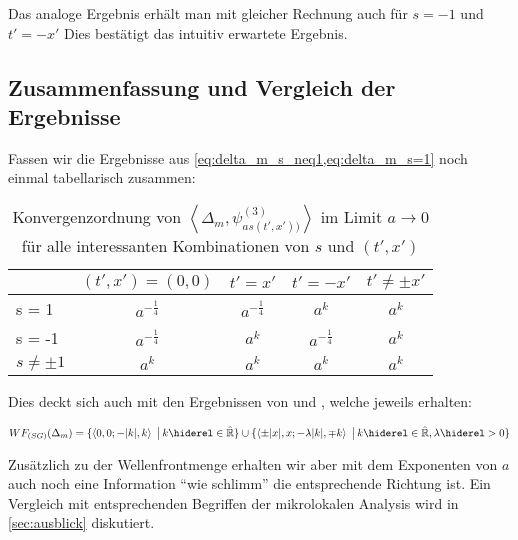 Das analoge Ergebnis erhält man mit gleicher Rechnung auch für $s=-1$ und $t' = -x'$
Dies bestätigt das intuitiv erwartete Ergebnis.

\subsection{Zusammenfassung und Vergleich der Ergebnisse}
 Fassen wir die Ergebnisse aus
 \cref{eq:delta_m_s_neq1,eq:delta_m_s=1} noch einmal tabellarisch zusammen:

\begin{table}[h]
\centering
\begin{tabular}{l|cccc}
        & \multicolumn{1}{l}{$(t', x') = (0, 0)$} & \multicolumn{1}{l}{$t' = x'$} & \multicolumn{1}{l}{$t' = -x'$} & \multicolumn{1}{l}{$t' \neq \pm x'$} \\ \hline
s = 1   & $a^{-\frac{1}{4}}$    & $a^{-\frac{1}{4}}$    & $a^k$  & $a^k$    \\
s = -1  & $a^{-\frac{1}{4}}$    & $a^k$    & $a^{-\frac{1}{4}}$  & $a^k$    \\
$s \neq \pm 1$  & $a^k$         & $a^k$    & $a^k$               & $a^k$    \\
\end{tabular}
\caption{Konvergenzordnung von $\left<\Delta_m, \psi_{as(t',x'))}^{(3)}\right>$ im Limit $a \rightarrow 0$ für alle interessanten Kombinationen von $s$ und $(t',x')$}
\label{tab:wavefront_set_massive_two_point_function}
\end{table}


Dies deckt sich auch mit den Ergebnissen von \textcite{Schulz2014} und \textcite{Hoermander1985}, welche jeweils erhalten:

\begin{dmath*}
    WF_{(SG)}(\Delta_m) =
    \{\left\langle 0,0; -|k|,k\right\rangle\ \big|\, k \hiderel\in \hat{\mathbb{R}}\}
    \cup
    \{\left\langle \pm |x|, x; -\lambda |k|,\mp k\right\rangle\ \big|\, k \hiderel\in \hat{\mathbb{R}}, \lambda \hiderel> 0\}
\end{dmath*}


Zusätzlich zu der Wellenfrontmenge erhalten wir aber mit dem Exponenten von $a$ auch noch eine Information "`wie schlimm"' die entsprechende Richtung ist. Ein Vergleich mit entsprechenden Begriffen der mikrolokalen Analysis wird in \cref{sec:ausblick} diskutiert.
